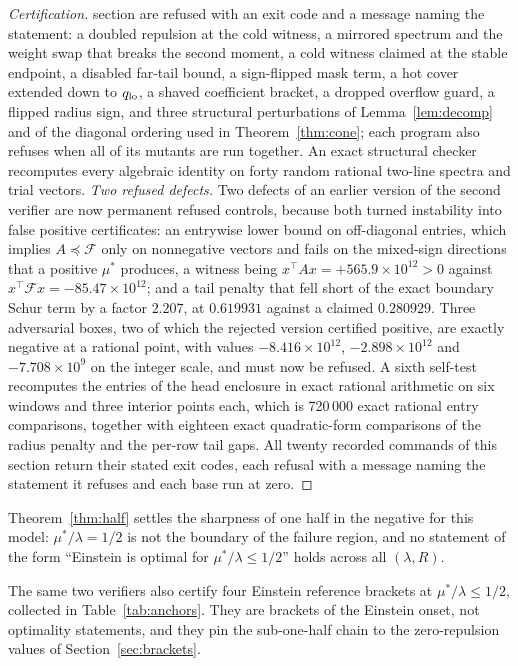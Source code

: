 \documentclass[11pt]{article}
\newcommand{\Fcal}{\mathcal F}
\newcommand{\muS}{\mu^{*}}
\theoremstyle{definition}
\theoremstyle{remark}
\begin{document}
\begin{proof}[Certification]
section are refused with an exit code and a message naming the statement: a doubled
repulsion at the cold witness, a mirrored spectrum and the weight swap that breaks the
second moment, a cold witness claimed at the stable endpoint, a disabled far-tail bound, a
sign-flipped mask term, a hot cover extended down to $q_{\rm lo}$, a shaved coefficient
bracket, a dropped overflow guard, a flipped radius sign, and three structural
perturbations of Lemma~\ref{lem:decomp} and of the diagonal ordering used in
Theorem~\ref{thm:cone}; each program also refuses when all of its mutants are run
together. An exact structural checker recomputes every algebraic identity on forty random
rational two-line spectra and trial vectors.
\emph{Two refused defects.} Two defects of an earlier version of the second verifier are
now permanent refused controls, because both turned instability into false positive
certificates: an entrywise lower bound on off-diagonal entries, which implies
$A\preceq\Fcal$ only on nonnegative vectors and fails on the mixed-sign directions that a
positive $\muS$ produces, a witness being $x^{\!\top}Ax=+565.9\times10^{12}>0$ against
$x^{\!\top}\Fcal x=-85.47\times10^{12}$; and a tail penalty that fell short of the exact
boundary Schur term by a factor $2.207$, at $0.619931$ against a claimed $0.280929$. Three
adversarial boxes, two of which the rejected version certified positive, are exactly
negative at a rational point, with values $-8.416\times10^{12}$, $-2.898\times10^{12}$ and
$-7.708\times10^{9}$ on the integer scale, and must now be refused. A sixth self-test
recomputes the entries of the head enclosure in exact rational arithmetic on six windows
and three interior points each, which is 720\,000 exact rational entry comparisons,
together with eighteen exact quadratic-form comparisons of the radius penalty and the
per-row tail gaps. All twenty
recorded commands of this section return their stated exit codes, each refusal with a
message naming the statement it refuses and each base run at zero.
\end{proof}

Theorem~\ref{thm:half} settles the sharpness of one half in the negative for this model:
$\muS/\lambda=1/2$ is not the boundary of the failure region, and no statement of the form
``Einstein is optimal for $\muS/\lambda\le1/2$'' holds across all $(\lambda,R)$.

The same two verifiers also certify four Einstein reference brackets at
$\muS/\lambda\le1/2$, collected in Table~\ref{tab:anchors}. They are brackets of the
Einstein onset, not optimality statements, and they pin the sub-one-half chain to the
zero-repulsion values of Section~\ref{sec:brackets}.
\end{document}
